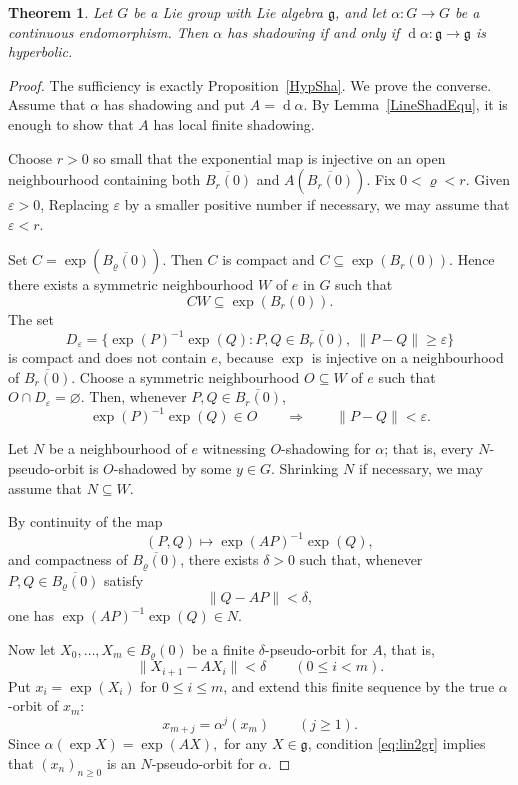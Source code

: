 \documentclass[12pt]{amsart}
\newtheorem{theorem}{Theorem}[section]
\theoremstyle{definition}
\numberwithin{equation}{section}
\theoremstyle{remark}
\DeclareMathOperator{\di}{d}
\begin{document}
\begin{theorem}\label{LieChar}
Let $G$ be a Lie group with Lie algebra $\mathfrak g$, and let $\alpha:G\to G$ be a continuous endomorphism.
Then $\alpha$ has shadowing if and only if
$\di\alpha:\mathfrak g\to\mathfrak g$ is hyperbolic.
\end{theorem}

\begin{proof}
The sufficiency is exactly Proposition~\ref{HypSha}. We prove the converse.
Assume that $\alpha$ has shadowing and put
$
A=\di\alpha.
$
By Lemma~\ref{LineShadEqu}, it is enough to show that $A$ has local finite
shadowing.

Choose
$r>0$ so small that the exponential map is injective on an open
neighbourhood containing both $\overline{B_r(0)}$ and
$A(\overline{B_r(0)})$. Fix $0<\varrho<r$. Given $\varepsilon>0$,
Replacing $\varepsilon$ by a smaller positive number if necessary, we may
assume that $\varepsilon<r$.

Set
$
C=\exp(\overline{B_\varrho(0)}).
$
Then $C$ is compact and $C\subseteq \exp(B_r(0))$. Hence there exists a
symmetric neighbourhood $W$ of $e$ in $G$ such that
\begin{equation}\label{eq:nbd}
CW\subseteq \exp(B_r(0)).
\end{equation}
The set
\[
D_\varepsilon=\{\exp(P)^{-1}\exp(Q):P,Q\in\overline{B_r(0)},
\ \|P-Q\|\geq\varepsilon\}
\]
is compact and does not contain $e$, because $\exp$ is injective on a
neighbourhood of $\overline{B_r(0)}$. Choose a symmetric neighbourhood
$O\subseteq W$ of $e$ such that $O\cap D_\varepsilon=\varnothing$. Then,
whenever $P,Q\in\overline{B_r(0)}$,
\begin{equation}\label{eq:uni}
\exp(P)^{-1}\exp(Q)\in O
\qquad \Longrightarrow
\qquad
\|P-Q\|<\varepsilon.
\end{equation}

Let $N$ be a neighbourhood of $e$ witnessing $O$-shadowing for $\alpha$;
that is, every $N$-pseudo-orbit is $O$-shadowed by some $y\in G$. Shrinking
$N$ if necessary, we may assume that $N\subseteq W$.

By continuity of the map
\[
(P,Q)\mapsto \exp(AP)^{-1}\exp(Q),
\]
and compactness of $\overline{B_\varrho(0)}$, there exists $\delta>0$ such
that, whenever $P,Q\in\overline{B_\varrho(0)}$ satisfy
\begin{equation}\label{eq:lin2gr}
\|Q-AP\|<\delta,
\end{equation}
one has $\exp(AP)^{-1}\exp(Q)\in N$.

Now let $X_0,\ldots,X_m\in B_\varrho(0)$ be a finite $\delta$-pseudo-orbit
for $A$, that is,
\[
\|X_{i+1}-AX_i\|<\delta\qquad (0\leq i<m).
\]
Put
$x_i=\exp(X_i)$ for $0\leq i\leq m$,
and extend this finite sequence by the true $\alpha$-orbit of $x_m$:
\[
x_{m+j}=\alpha^j(x_m)\qquad (j\geq 1).
\]
Since
$
\alpha(\exp X)=\exp(AX),
$
for any $X\in \mathfrak g$,
condition \eqref{eq:lin2gr} implies that
$(x_n)_{n\geq 0}$ is an $N$-pseudo-orbit for $\alpha$.


\end{proof}
\end{document}

